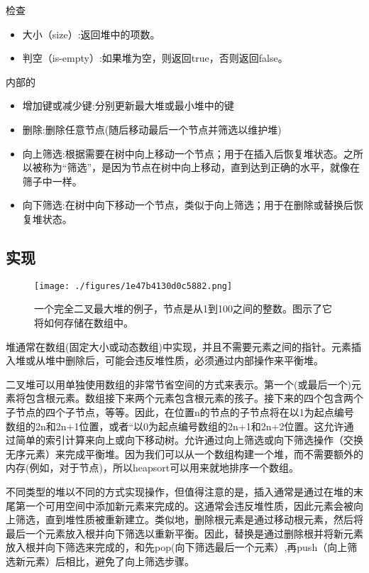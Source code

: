 检查
\begin{itemize}
\item 大小（size）:返回堆中的项数。
\item 判空（is-empty）:如果堆为空，则返回true，否则返回false。
\end{itemize}

内部的
\begin{itemize}
\item 增加键或减少键:分别更新最大堆或最小堆中的键
\item 删除:删除任意节点(随后移动最后一个节点并筛选以维护堆)
\item 向上筛选:根据需要在树中向上移动一个节点；用于在插入后恢复堆状态。之所以被称为“筛选”，是因为节点在树中向上移动，直到达到正确的水平，就像在筛子中一样。
\item 向下筛选:在树中向下移动一个节点，类似于向上筛选；用于在删除或替换后恢复堆状态。
\end{itemize}

\subsection{实现}
\begin{figure}[ht]
\centering
\texttt{[image: ./figures/1e47b4130d0c5882.png]}
\caption{一个完全二叉最大堆的例子，节点是从1到100之间的整数。图示了它将如何存储在数组中。} \label{fig_DUI_1}
\end{figure}
堆通常在数组(固定大小或动态数组)中实现，并且不需要元素之间的指针。元素插入堆或从堆中删除后，可能会违反堆性质，必须通过内部操作来平衡堆。

二叉堆可以用单独使用数组的非常节省空间的方式来表示。第一个(或最后一个)元素将包含根元素。数组接下来两个元素包含根元素的孩子。接下来的四个包含两个子节点的四个子节点，等等。因此，在位置n的节点的子节点将在以1为起点编号数组的2n和2n+1位置，或者“以0为起点编号数组的2n+1和2n+2位置。这允许通过简单的索引计算来向上或向下移动树。允许通过向上筛选或向下筛选操作（交换无序元素）来完成平衡堆。因为我们可以从一个数组构建一个堆，而不需要额外的内存(例如，对于节点)，所以heapsort可以用来就地排序一个数组。

不同类型的堆以不同的方式实现操作，但值得注意的是，插入通常是通过在堆的末尾第一个可用空间中添加新元素来完成的。这通常会违反堆性质，因此元素会被向上筛选，直到堆性质被重新建立。类似地，删除根元素是通过移动根元素，然后将最后一个元素放入根并向下筛选以重新平衡。因此，替换是通过删除根并将新元素放入根并向下筛选来完成的，和先pop(向下筛选最后一个元素）,再push（向上筛选新元素）后相比，避免了向上筛选步骤。

